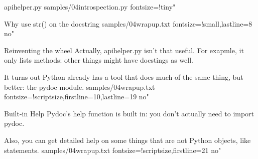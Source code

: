 \documentclass{pyslides}
\begin{document}
\begin{frame}[fragile]{apihelper.py}
 samples/04introspection.py fontsize=!tiny"
\end{frame}

\begin{frame}[fragile]{Why use str() on the docstring}
 samples/04wrapup.txt fontsize=!small,lastline=8 no"
\end{frame}

\begin{frame}[fragile]{Reinventing the wheel}
Actually, apihelper.py isn't that useful. For exapmle, it only lists methods:
other things might have docstings as well.

It turns out Python already has a tool that
does much of the same thing, but better: the pydoc module.
\bigskip
 samples/04wrapup.txt fontsize=!scriptsize,firstline=10,lastline=19 no"
\end{frame}

\begin{frame}[fragile]{Built-in Help}
Pydoc's help function is built in: you don't actually need to import pydoc.

Also, you can get detailed help on some things that are not Python objects, like statements.
\bigskip
 samples/04wrapup.txt fontsize=!scriptsize,firstline=21 no"
\end{frame}
\end{document}
